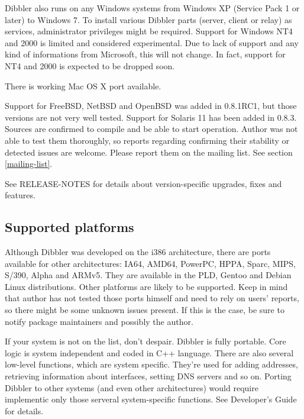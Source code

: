 Dibbler also runs on any Windows systems from Windows XP (Service Pack
1 or later) to Windows 7. To install various Dibbler parts (server,
client or relay) as services, administrator privileges might be
required. Support for Windows NT4 and 2000 is limited and considered
experimental. Due to lack of support and any kind of informations from
Microsoft, this will not change. In fact, support for NT4 and 2000 is
expected to be dropped soon.

There is working Mac OS X port available.

Support for FreeBSD, NetBSD and OpenBSD was added in 0.8.1RC1, but
those versions are not very well tested. Support for Solaris 11 has
been added in 0.8.3. Sources are confirmed to compile
and be able to start operation. Author was not able to test them
thoroughly, so reports regarding confirming their stability or
detected issues are welcome. Please report them on the mailing
list. See section \ref{mailing-list}.

See RELEASE-NOTES for details about version-specific upgrades, fixes
and features.

\subsection{Supported platforms}
Although Dibbler was developed on the i386 architecture, there are
ports available for other architectures: IA64, AMD64, PowerPC, HPPA,
Sparc, MIPS, S/390, Alpha and ARMv5. They are available in the PLD,
Gentoo and Debian Linux distributions. Other platforms are likely to
be supported. Keep in mind that author has not tested those ports
himself and need to rely on users' reports, so there might be some
unknown issues present. If this is the case, be sure to notify package
maintainers and possibly the author.

If your system is not on the list, don't despair. Dibbler is fully
portable. Core logic is system independent and coded in C++
language. There are also several low-level functions, which are system
specific. They're used for adding addresses, retrieving information about
interfaces, setting DNS servers and so on. Porting Dibbler to other
systems (and even other architectures) would require implementic only
those serveral system-specific functions. See Developer's Guide for
details.
